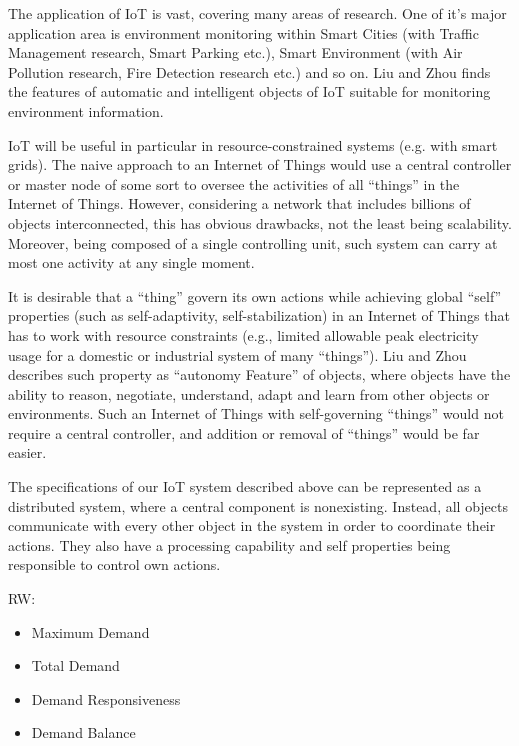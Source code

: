 \documentclass[../main/Self-Stabilization.tex]{subfiles}
\begin{document}
The application of IoT is vast, covering many areas of research. One of it's major application area is environment monitoring within Smart Cities (with Traffic Management research, Smart Parking etc.), Smart Environment (with Air Pollution research, Fire Detection research etc.) and so on. Liu and Zhou \cite{IoT6150221} finds the features of automatic and intelligent objects of IoT suitable for monitoring environment information.

IoT will be useful in particular in resource-constrained systems (e.g. with smart grids). The naive approach to an Internet of Things would use a central controller or master node of some sort to oversee the activities of all ``things'' in the Internet of Things. However, considering a network that includes billions of objects interconnected, this has obvious drawbacks, not the least being scalability. Moreover, being composed of a single controlling unit, such system can carry at most one activity at any single moment.

It is desirable that a ``thing'' govern its own actions while achieving global ``self'' properties (such as self-adaptivity, self-stabilization) in an Internet of Things that has to work with resource constraints (e.g., limited allowable peak electricity usage for a domestic or industrial system of many ``things''). Liu and Zhou \cite{IoT6150221} describes such property as ``autonomy Feature'' of objects, where objects have the ability to reason, negotiate, understand, adapt and learn from other objects or environments. Such an Internet of Things with self-governing ``things'' would not require a central controller, and addition or removal of ``things'' would be far easier.

The specifications of our IoT system described above can be represented as a distributed system, where a central component is nonexisting. Instead, all objects communicate with every other object in the system in order to coordinate their actions. They also have a processing capability and self properties being responsible to control own actions.

RW:
\begin{itemize}
  \item Maximum Demand
  \item Total Demand
  \item Demand Responsiveness
  \item Demand Balance
\end{itemize}
\end{document}
